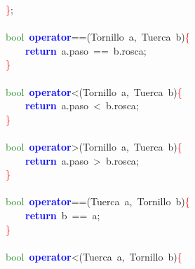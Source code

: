 \mbox{}\textcolor{Red}{\}}\textcolor{BrickRed}{;} \\
\mbox{} \\
\mbox{}\textcolor{ForestGreen}{bool}\ \textbf{\textcolor{Blue}{operator}}\textcolor{BrickRed}{==(}\textcolor{TealBlue}{Tornillo}\ a\textcolor{BrickRed}{,}\ \textcolor{TealBlue}{Tuerca}\ b\textcolor{BrickRed}{)}\textcolor{Red}{\{} \\
\mbox{}\ \ \ \ \textbf{\textcolor{Blue}{return}}\ a\textcolor{BrickRed}{.}paso\ \textcolor{BrickRed}{==}\ b\textcolor{BrickRed}{.}rosca\textcolor{BrickRed}{;} \\
\mbox{}\textcolor{Red}{\}} \\
\mbox{} \\
\mbox{}\textcolor{ForestGreen}{bool}\ \textbf{\textcolor{Blue}{operator}}\textcolor{BrickRed}{\textless{}(}\textcolor{TealBlue}{Tornillo}\ a\textcolor{BrickRed}{,}\ \textcolor{TealBlue}{Tuerca}\ b\textcolor{BrickRed}{)}\textcolor{Red}{\{} \\
\mbox{}\ \ \ \ \textbf{\textcolor{Blue}{return}}\ a\textcolor{BrickRed}{.}paso\ \textcolor{BrickRed}{\textless{}}\ b\textcolor{BrickRed}{.}rosca\textcolor{BrickRed}{;} \\
\mbox{}\textcolor{Red}{\}} \\
\mbox{} \\
\mbox{}\textcolor{ForestGreen}{bool}\ \textbf{\textcolor{Blue}{operator}}\textcolor{BrickRed}{\textgreater{}(}\textcolor{TealBlue}{Tornillo}\ a\textcolor{BrickRed}{,}\ \textcolor{TealBlue}{Tuerca}\ b\textcolor{BrickRed}{)}\textcolor{Red}{\{} \\
\mbox{}\ \ \ \ \textbf{\textcolor{Blue}{return}}\ a\textcolor{BrickRed}{.}paso\ \textcolor{BrickRed}{\textgreater{}}\ b\textcolor{BrickRed}{.}rosca\textcolor{BrickRed}{;} \\
\mbox{}\textcolor{Red}{\}} \\
\mbox{} \\
\mbox{}\textcolor{ForestGreen}{bool}\ \textbf{\textcolor{Blue}{operator}}\textcolor{BrickRed}{==(}\textcolor{TealBlue}{Tuerca}\ a\textcolor{BrickRed}{,}\ \textcolor{TealBlue}{Tornillo}\ b\textcolor{BrickRed}{)}\textcolor{Red}{\{} \\
\mbox{}\ \ \ \ \textbf{\textcolor{Blue}{return}}\ b\ \textcolor{BrickRed}{==}\ a\textcolor{BrickRed}{;} \\
\mbox{}\textcolor{Red}{\}} \\
\mbox{} \\
\mbox{}\textcolor{ForestGreen}{bool}\ \textbf{\textcolor{Blue}{operator}}\textcolor{BrickRed}{\textless{}(}\textcolor{TealBlue}{Tuerca}\ a\textcolor{BrickRed}{,}\ \textcolor{TealBlue}{Tornillo}\ b\textcolor{BrickRed}{)}\textcolor{Red}{\{} \\
